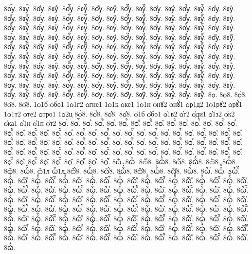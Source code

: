 {8ѹⷢ҇.
8ᲂуⷢ҇.
8ѹⷣ.
8ᲂуⷣ.
8ѹⷣ҇.
8ᲂуⷣ҇.
8ѹⷤ.
8ᲂуⷤ.
8ѹⷤ҇.
8ᲂуⷤ҇.
8ѹⷥ.
8ᲂуⷥ.
8ѹⷥ҇.
8ᲂуⷥ҇.
8ѹⷦ.
8ᲂуⷦ.
8ѹⷦ҇.
8ᲂуⷦ҇.
8ѹⷧ.
8ᲂуⷧ.
8ѹⷧ҇.
8ᲂуⷧ҇.
8ѹⷨ.
8ᲂуⷨ.
8ѹⷨ҇.
8ᲂуⷨ҇.
8ѹⷩ.
8ᲂуⷩ.
8ѹⷩ҇.
8ᲂуⷩ҇.
8ѹⷪ.
8ᲂуⷪ.
8ѹⷪ҇.
8ᲂуⷪ҇.
8ѹⷫ.
8ᲂуⷫ.
8ѹⷫ҇.
8ᲂуⷫ҇.
8ѹⷬ.
8ᲂуⷬ.
8ѹⷬ҇.
8ᲂуⷬ҇.
8ѹⷭ.
8ᲂуⷭ.
8ѹⷭ҇.
8ᲂуⷭ҇.
8ѹⷮ.
8ᲂуⷮ.
8ѹⷮ҇.
8ᲂуⷮ҇.
8ѹⷯ.
8ᲂуⷯ.
8ѹⷯ҇.
8ᲂуⷯ҇.
8ѹⷰ.
8ᲂуⷰ.
8ѹⷰ҇.
8ᲂуⷰ҇.
8ѹⷱ.
8ᲂуⷱ.
8ѹⷱ҇.
8ᲂуⷱ҇.
8ѹⷲ.
8ᲂуⷲ.
8ѹⷲ҇.
8ᲂуⷲ҇.
8ѹⷳ.
8ᲂуⷳ.
8ѹⷳ҇.
8ᲂуⷳ҇.
8ѹⷴ.
8ᲂуⷴ.
8ѹⷴ҇.
8ᲂуⷴ҇.
8ѹⷵ.
8ᲂуⷵ.
8ѹⷵ҇.
8ᲂуⷵ҇.
8ѹⷶ.
8ᲂуⷶ.
8ѹⷶ҇.
8ᲂуⷶ҇.
8ѹⷷ.
8ᲂуⷷ.
8ѹⷷ҇.
8ᲂуⷷ҇.
8ѹⷸ.
8ᲂуⷸ.
8ѹⷸ҇.
8ᲂуⷸ҇.
8ѹⷹ.
8ᲂуⷹ.
8ѹⷹ҇.
8ᲂуⷹ҇.
8ѹⷺ.
8ᲂуⷺ.
8ѹⷺ҇.
8ᲂуⷺ҇.
8ѹⷻ.
8ᲂуⷻ.
8ѹⷻ҇.
8ᲂуⷻ҇.
8ѹⷼ.
8ᲂуⷼ.
8ѹⷼ҇.
8ᲂуⷼ҇.
8ѹⷽ.
8ᲂуⷽ.
8ѹⷽ҇.
8ᲂуⷽ҇.
8ѹⷾ.
8ᲂуⷾ.
8ѹⷾ҇.
8ᲂуⷾ҇.
8ѹⷿ.
8ᲂуⷿ.
8ѹⷿ҇.
8ᲂуⷿ҇.
8ѹꙴ.
8ᲂуꙴ.
8ѹꙴ҇.
8ᲂуꙴ҇.
8ѹꙵ.
8ᲂуꙵ.
8ѹꙵ҇.
8ᲂуꙵ҇.
8ѹꙶ.
8ᲂуꙶ.
8ѹꙶ҇.
8ᲂуꙶ҇.
8ѹꙷ.
8ᲂуꙷ.
8ѹꙷ҇.
8ᲂуꙷ҇.
8ѹꙸ.
8ᲂуꙸ.
8ѹꙸ҇.
8ᲂуꙸ҇.
8ѹꙹ.
8ᲂуꙹ.
8ѹꙹ҇.
8ᲂуꙹ҇.
8ѹꙺ.
8ᲂуꙺ.
8ѹꙺ҇.
8ᲂуꙺ҇.
8ѹꙻ.
8ᲂуꙻ.
8ѹꙻ҇.
8ᲂуꙻ҇.
8ѹ꙼.
8ᲂу꙼.
8ѹ꙼҇.
8ᲂу꙼҇.
8ѹ꙽.
8ᲂу꙽.
8ѹ꙽҇.
8ᲂу꙽҇.
8ѻ.
8ѻ̀8.
8ѻ́8.
8ѻ̈8.
8ѻ̑8.
1ѻ1б
ѻбо1
1ѻ1г2
ѻгне1
1ѻ1к
ѻке1
1ѻ1н
ѻнꙋ2
ѻнꙋ́1
ѻр1д2
1ѻ1рꙋ2
ѻрꙋ́1
1ѻ1т2
ѻте2
ѻтро1
1ѻ2ц
8ѻ҆̀8.
8ѻ҆́8.
8ѻ҆̈8.
8ѻ҆̑8.
ѻ҆1б
ѻ҆бо1
ѻ҆1в2
ѻ҆г2
ѻ҆ди1
ѻ҆1з2
ѻ҆к2
ѻ҆ка1
ѻ҆1н
ѻ҆1п
ѻ҆т2
8ѻⷠ.
8ѻⷠ҇.
8ѻⷡ.
8ѻⷡ҇.
8ѻⷢ.
8ѻⷢ҇.
8ѻⷣ.
8ѻⷣ҇.
8ѻⷤ.
8ѻⷤ҇.
8ѻⷥ.
8ѻⷥ҇.
8ѻⷦ.
8ѻⷦ҇.
8ѻⷧ.
8ѻⷧ҇.
8ѻⷨ.
8ѻⷨ҇.
8ѻⷩ.
8ѻⷩ҇.
8ѻⷪ.
8ѻⷪ҇.
8ѻⷫ.
8ѻⷫ҇.
8ѻⷬ.
8ѻⷬ҇.
8ѻⷭ.
8ѻⷭ҇.
8ѻⷮ.
8ѻⷮ҇.
8ѻⷯ.
8ѻⷯ҇.
8ѻⷰ.
8ѻⷰ҇.
8ѻⷱ.
8ѻⷱ҇.
8ѻⷲ.
8ѻⷲ҇.
8ѻⷳ.
8ѻⷳ҇.
8ѻⷴ.
8ѻⷴ҇.
8ѻⷵ.
8ѻⷵ҇.
8ѻⷶ.
8ѻⷶ҇.
8ѻⷷ.
8ѻⷷ҇.
8ѻⷸ.
8ѻⷸ҇.
8ѻⷹ.
8ѻⷹ҇.
8ѻⷺ.
8ѻⷺ҇.
8ѻⷻ.
8ѻⷻ҇.
8ѻⷼ.
8ѻⷼ҇.
8ѻⷽ.
8ѻⷽ҇.
8ѻⷾ.
8ѻⷾ҇.
8ѻⷿ.
8ѻⷿ҇.
8ѻꙴ.
8ѻꙴ҇.
8ѻꙵ.
8ѻꙵ҇.
8ѻꙶ.
8ѻꙶ҇.
8ѻꙷ.
8ѻꙷ҇.
8ѻꙸ.
8ѻꙸ҇.
8ѻꙹ.
8ѻꙹ҇.
8ѻꙺ.
8ѻꙺ҇.
8ѻꙻ.
8ѻꙻ҇.
8ѻ꙼.
8ѻ꙼҇.
8ѻ꙽.
8ѻ꙽҇.
8ѽ.
8ꙍ҆̑.
8ѽ̀8.
8ꙍ҆̑̀8.
8ѽ́8.
8ꙍ҆̑́8.
8ѽ̈8.
8ꙍ҆̑̈8.
8ѽ̑8.
8ꙍ҆̑̑8.
ѽ1л
ꙍ҆̑1л
8ѽ҆̀8.
8ꙍ҆̑҆̀8.
8ѽ҆́8.
8ꙍ҆̑҆́8.
8ѽ҆̈8.
8ꙍ҆̑҆̈8.
8ѽ҆̑8.
8ꙍ҆̑҆̑8.
8ѽⷠ.
8ꙍ҆̑ⷠ.
8ѽⷠ҇.
8ꙍ҆̑ⷠ҇.
8ѽⷡ.
8ꙍ҆̑ⷡ.
8ѽⷡ҇.
8ꙍ҆̑ⷡ҇.
8ѽⷢ.
8ꙍ҆̑ⷢ.
8ѽⷢ҇.
8ꙍ҆̑ⷢ҇.
8ѽⷣ.
8ꙍ҆̑ⷣ.
8ѽⷣ҇.
8ꙍ҆̑ⷣ҇.
8ѽⷤ.
8ꙍ҆̑ⷤ.
8ѽⷤ҇.
8ꙍ҆̑ⷤ҇.
8ѽⷥ.
8ꙍ҆̑ⷥ.
8ѽⷥ҇.
8ꙍ҆̑ⷥ҇.
8ѽⷦ.
8ꙍ҆̑ⷦ.
8ѽⷦ҇.
8ꙍ҆̑ⷦ҇.
8ѽⷧ.
8ꙍ҆̑ⷧ.
8ѽⷧ҇.
8ꙍ҆̑ⷧ҇.
8ѽⷨ.
8ꙍ҆̑ⷨ.
8ѽⷨ҇.
8ꙍ҆̑ⷨ҇.
8ѽⷩ.
8ꙍ҆̑ⷩ.
8ѽⷩ҇.
8ꙍ҆̑ⷩ҇.
8ѽⷪ.
8ꙍ҆̑ⷪ.
8ѽⷪ҇.
8ꙍ҆̑ⷪ҇.
8ѽⷫ.
8ꙍ҆̑ⷫ.
8ѽⷫ҇.
8ꙍ҆̑ⷫ҇.
8ѽⷬ.
8ꙍ҆̑ⷬ.
8ѽⷬ҇.
8ꙍ҆̑ⷬ҇.
8ѽⷭ.
8ꙍ҆̑ⷭ.
8ѽⷭ҇.
8ꙍ҆̑ⷭ҇.
8ѽⷮ.
8ꙍ҆̑ⷮ.
8ѽⷮ҇.
8ꙍ҆̑ⷮ҇.
8ѽⷯ.
8ꙍ҆̑ⷯ.
8ѽⷯ҇.
8ꙍ҆̑ⷯ҇.
8ѽⷰ.
8ꙍ҆̑ⷰ.
8ѽⷰ҇.
8ꙍ҆̑ⷰ҇.
8ѽⷱ.
8ꙍ҆̑ⷱ.
8ѽⷱ҇.
8ꙍ҆̑ⷱ҇.
8ѽⷲ.
8ꙍ҆̑ⷲ.
8ѽⷲ҇.
8ꙍ҆̑ⷲ҇.
8ѽⷳ.
8ꙍ҆̑ⷳ.
8ѽⷳ҇.
8ꙍ҆̑ⷳ҇.
8ѽⷴ.
8ꙍ҆̑ⷴ.
8ѽⷴ҇.
8ꙍ҆̑ⷴ҇.
8ѽⷵ.
8ꙍ҆̑ⷵ.
8ѽⷵ҇.
8ꙍ҆̑ⷵ҇.
8ѽⷶ.
8ꙍ҆̑ⷶ.
8ѽⷶ҇.
8ꙍ҆̑ⷶ҇.
8ѽⷷ.
8ꙍ҆̑ⷷ.
8ѽⷷ҇.
8ꙍ҆̑ⷷ҇.
8ѽⷸ.
8ꙍ҆̑ⷸ.
8ѽⷸ҇.
8ꙍ҆̑ⷸ҇.
8ѽⷹ.
8ꙍ҆̑ⷹ.
8ѽⷹ҇.
8ꙍ҆̑ⷹ҇.
8ѽⷺ.
8ꙍ҆̑ⷺ.
8ѽⷺ҇.
8ꙍ҆̑ⷺ҇.
8ѽⷻ.
8ꙍ҆̑ⷻ.
8ѽⷻ҇.
8ꙍ҆̑ⷻ҇.
8ѽⷼ.
8ꙍ҆̑ⷼ.
8ѽⷼ҇.
8ꙍ҆̑ⷼ҇.
8ѽⷽ.
8ꙍ҆̑ⷽ.
8ѽⷽ҇.
8ꙍ҆̑ⷽ҇.
8ѽⷾ.
8ꙍ҆̑ⷾ.
8ѽⷾ҇.
8ꙍ҆̑ⷾ҇.
8ѽⷿ.
8ꙍ҆̑ⷿ.
8ѽⷿ҇.
8ꙍ҆̑ⷿ҇.
8ѽꙴ.
8ꙍ҆̑ꙴ.
}
